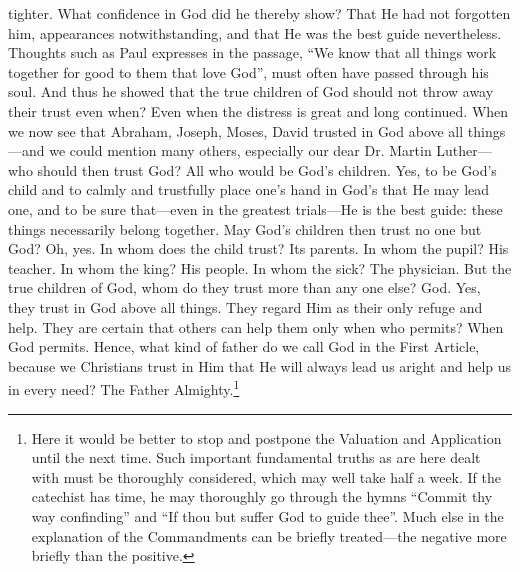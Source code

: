 tighter. What confidence in God did he thereby show? That He had not forgotten him, appearances notwithstanding, and that He was the best guide nevertheless. Thoughts such as Paul expresses in the passage, “We know that all things work together for good to them that love God”, must often have passed through his soul. And thus he showed that the true children of God should not throw away their trust even when? Even when the distress is great and long continued. When we now see that Abraham, Joseph, Moses, David trusted in God above all things—and we could mention many others, especially our dear Dr. Martin Luther—who should then trust God? All who would be God’s children. Yes, to be God’s child and to calmly and trustfully place one’s hand in God’s that He may lead one, and to be sure that—even in the greatest trials—He is the best guide: these things necessarily belong together. May God’s children then trust no one but God? Oh, yes. In whom does the child trust? Its parents. In whom the pupil? His teacher. In whom the king? His people. In whom the sick? The physician. But the true children of God, whom do they trust more than any one else? God. Yes, they trust in God above all things. They regard Him as their only refuge and help. They are certain that others can help them only when who permits? When God permits. Hence, what kind of father do we call God in the First Article, because we Christians trust in Him that He will always lead us aright and help us in every need? The Father Almighty.\footnote{Here it would be better to stop and postpone the Valuation and Application until the next time. Such important fundamental truths as are here dealt with must be thoroughly considered, which may well take half a week. If the catechist has time, he may thoroughly go through the hymns “Commit thy way confinding” and “If thou but suffer God to guide thee”. Much else in the explanation of the Commandments can be briefly treated—the negative more briefly than the positive.}

